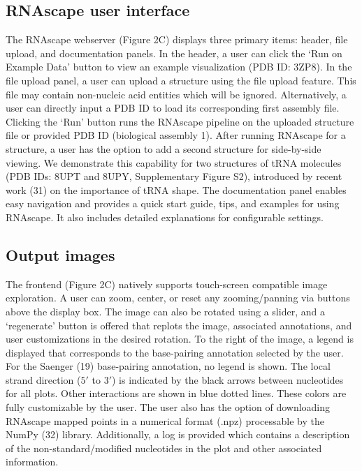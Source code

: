\subsection{RNAscape user interface}

The RNAscape webserver (Figure 2C) displays three primary items: header, file upload, and documentation panels. In the header, a user can click the ‘Run on Example Data’ button to view an example visualization (PDB ID: 3ZP8). In the file upload panel, a user can upload a structure using the file upload feature. This file may contain non-nucleic acid entities which will be ignored. Alternatively, a user can directly input a PDB ID to load its corresponding first assembly file. Clicking the ‘Run’ button runs the RNAscape pipeline on the uploaded structure file or provided PDB ID (biological assembly 1). After running RNAscape for a structure, a user has the option to add a second structure for side-by-side viewing. We demonstrate this capability for two structures of tRNA molecules (PDB IDs: 8UPT and 8UPY, Supplementary Figure S2), introduced by recent work (31) on the importance of tRNA shape. The documentation panel enables easy navigation and provides a quick start guide, tips, and examples for using RNAscape. It also includes detailed explanations for configurable settings.

\subsection{Output images}

The frontend (Figure 2C) natively supports touch-screen compatible image exploration. A user can zoom, center, or reset any zooming/panning via buttons above the display box. The image can also be rotated using a slider, and a ‘regenerate’ button is offered that replots the image, associated annotations, and user customizations in the desired rotation. To the right of the image, a legend is displayed that corresponds to the base-pairing annotation selected by the user. For the Saenger (19) base-pairing annotation, no legend is shown. The local strand direction ($5'$ to $3'$) is indicated by the black arrows between nucleotides for all plots. Other interactions are shown in blue dotted lines. These colors are fully customizable by the user. The user also has the option of downloading RNAscape mapped points in a numerical format (.npz) processable by the NumPy (32) library. Additionally, a log is provided which contains a description of the non-standard/modified nucleotides in the plot and other associated information.


